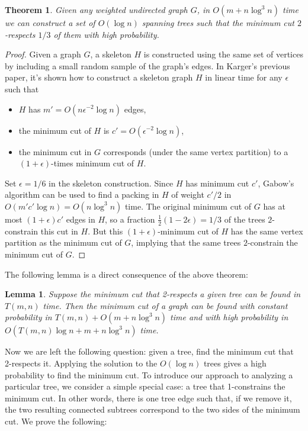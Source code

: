 \documentclass[11pt]{article}
\theoremstyle{plain}
\newtheorem{lemma}{Lemma}[section]
\newtheorem{theorem}{Theorem}[section]
\begin{document}
\begin{theorem}
    \label{theorem:2respect}
    Given any weighted undirected graph $G$, in $O(m+n\log^3 n)$ time we can construct a set of $O(\log n)$ spanning trees such that the minimum cut $2$-respects $1/3$ of them with high probability.
\end{theorem}

\begin{proof}
    Given a graph $G$, a skeleton $H$ is constructed using the same set of vertices by including a small random sample of the graph's edges. In Karger's previous paper\cite{karger1994random}, it's shown how to construct a skeleton graph $H$ in linear time for any $\epsilon$ such that
    \begin{itemize}
    \item $H$ has $m' = O(n\epsilon^{-2}\log n)$ edges,
    \item the minimum cut of $H$ is $c' = O(\epsilon^{-2}\log n)$,
    \item the minimum cut in $G$ corresponds (under the same vertex
      partition) to a $(1+\epsilon)$-times minimum cut of $H$.
    \end{itemize}
    Set $\epsilon=1/6$ in the skeleton construction.  Since $H$ has
    minimum cut $c'$, Gabow's algorithm\cite{gabow1991faster} can be used to find a packing in $H$ of weight $c'/2$ in $O(m'c'\log n)=O(n\log^3 n)$ time.  The original minimum cut of $G$ has at most $(1 +\epsilon)c'$ edges in $H$, so a fraction $\frac12(1-2\epsilon)=1/3$ of the trees $2$-constrain this cut in $H$.  But this $(1+\epsilon)$-minimum cut of $H$ has the same vertex partition as the minimum cut of $G$, implying that the same trees $2$-constrain the minimum cut of $G$.
\end{proof}

The following lemma is a direct consequence of the above theorem:
\begin{lemma}
    \label{lemma:2respect}
    Suppose the minimum cut that 2-respects a given tree can be found in $T(m,n)$ time.  Then the minimum cut of a graph can be found with constant probability in $T(m,n)+O(m+n\log^3 n)$ time and with high probability in $O(T(m,n)\log n+m+n\log^3 n)$ time.
\end{lemma}

Now we are left the following question: given a tree, find the minimum cut that 2-respects it. Applying the solution to the $O(\log n)$ trees gives a high probability to find the minimum cut. To introduce our approach to analyzing a particular tree, we consider a simple special case: a tree that 1-constrains the minimum cut. In other words, there is one tree edge such that, if we remove it, the two resulting connected subtrees correspond to the two sides of the minimum cut. We prove the following:
\end{document}
